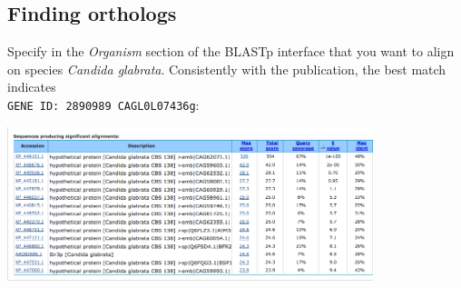 \documentclass[a4paper,11pt]{article}
\begin{document}
\subsection{Finding orthologs}

Specify in the \textit{Organism} section of the BLASTp interface that you want to align on species \emph{Candida glabrata}. Consistently with the publication, the best match indicates \\ 
\texttt{GENE ID: 2890989 CAGL0L07436g}:

\vspace{0.5cm}
\begin{center}
\includegraphics[width=0.8\textwidth]{blastp_ortholog.png}
\end{center}
\vspace{0.5cm}
\end{document}
